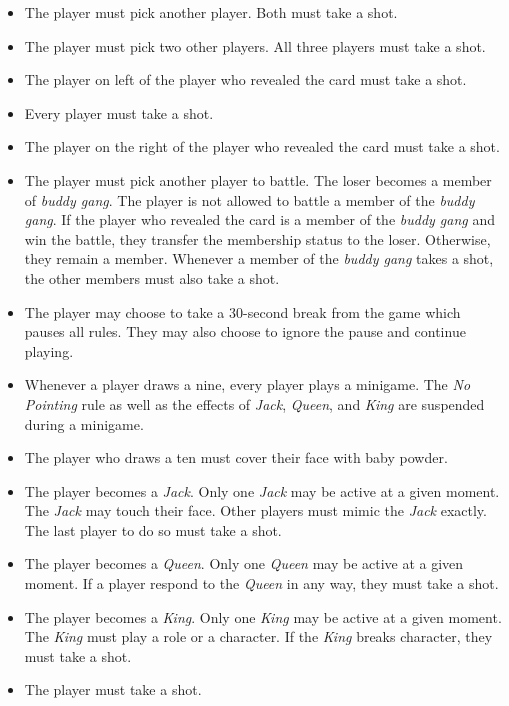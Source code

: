 \documentclass{article}
\begin{document}
\begin{itemize}
    \item [\textbf{2s}] The player must pick another player. Both must take a shot.
    \item [\textbf{3s}] The player must pick two other players. All three players must take a shot.
    \item [\textbf{4s}] The player on left of the player who revealed the card must take a shot.
    \item [\textbf{5s}] Every player must take a shot.
    \item [\textbf{6s}] The player on the right of the player who revealed the card must take a shot.
    \item [\textbf{7s}] The player must pick another player to battle. The loser becomes a member of \textit{buddy gang}. The player is not allowed to battle a member of the \textit{buddy gang}. If the player who revealed the card is a member of the \textit{buddy gang} and win the battle, they transfer the membership status to the loser. Otherwise, they remain a member. Whenever a member of the \textit{buddy gang} takes a shot, the other members must also take a shot.
    \item [\textbf{8s}] The player may choose to take a 30-second break from the game which pauses all rules. They may also choose to ignore the pause and continue playing.
    \item [\textbf{9s}] Whenever a player draws a nine, every player plays a minigame. The \textit{No Pointing} rule as well as the effects of \textit{Jack}, \textit{Queen}, and \textit{King} are suspended during a minigame.
    \item [\textbf{10s}] The player who draws a ten must cover their face with baby powder.
    \item [\textbf{Jacks}] The player becomes a \textit{Jack}. Only one \textit{Jack} may be active at a given moment. The \textit{Jack} may touch their face. Other players must mimic the \textit{Jack} exactly. The last player to do so must take a shot.
    \item [\textbf{Queens}] The player becomes a \textit{Queen}. Only one \textit{Queen} may be active at a given moment. If a player respond to the \textit{Queen} in any way, they must take a shot.
    \item [\textbf{Kings}] The player becomes a \textit{King}. Only one \textit{King} may be active at a given moment. The \textit{King} must play a role or a character. If the \textit{King} breaks character, they must take a shot.
    \item [\textbf{Aces}] The player must take a shot.



\end{itemize}
\end{document}
